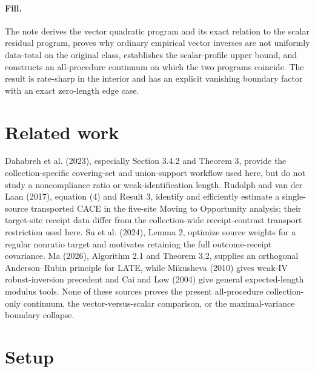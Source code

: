 \documentclass{article}
\begin{document}
\paragraph{Fill.} The note derives the vector quadratic program and its exact relation to the scalar residual program, proves why ordinary empirical vector inverses are not uniformly data-total on the original class, establishes the scalar-profile upper bound, and constructs an all-procedure continuum on which the two programs coincide. The result is rate-sharp in the interior and has an explicit vanishing boundary factor with an exact zero-length edge case.

\section{Related work}

Dahabreh et al. (2023), especially Section 3.4.2 and Theorem 3, provide the collection-specific covering-set and union-support workflow used here, but do not study a noncompliance ratio or weak-identification length. Rudolph and van der Laan (2017), equation (4) and Result 3, identify and efficiently estimate a single-source transported CACE in the five-site Moving to Opportunity analysis; their target-site receipt data differ from the collection-wide receipt-contrast transport restriction used here. Su et al. (2024), Lemma 2, optimize source weights for a regular nonratio target and motivates retaining the full outcome-receipt covariance. Ma (2026), Algorithm 2.1 and Theorem 3.2, supplies an orthogonal Anderson--Rubin principle for LATE, while Mikusheva (2010) gives weak-IV robust-inversion precedent and Cai and Low (2004) give general expected-length modulus tools. None of these sources proves the present all-procedure collection-only continuum, the vector-versus-scalar comparison, or the maximal-variance boundary collapse.

\section{Setup}
\end{document}

